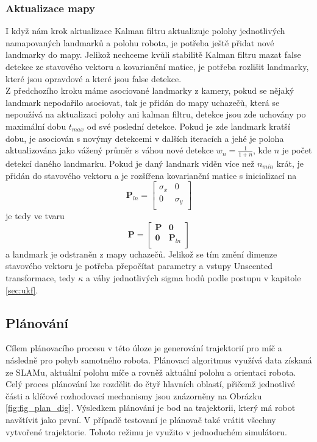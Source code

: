 \documentclass[a4paper,12pt]{article}
\begin{document}
\subsubsection{Aktualizace mapy}
I když nám krok aktualizace Kalman filtru aktualizuje polohy jednotlivých namapovaných landmarků a polohu robota, je potřeba ještě přidat nové landmarky do mapy.
Jelikož nechceme kvůli stabilitě Kalman filtru mazat false detekce ze stavového vektoru a kovarianční matice, 
je potřeba rozlišit landmarky, které jsou opravdové a které jsou false detekce.\\
Z předchozího kroku máme asociované landmarky z kamery, pokud se nějaký landmark nepodařilo asociovat, tak je přidán do mapy uchazečů, 
která se nepoužívá na aktualizaci polohy ani kalman filtru, detekce jsou zde uchovány po maximální dobu $t_{max}$ od své poslední detekce. 
Pokud je zde landmark kratší dobu, je asociován s novýmy detekcemi v dalších iteracích a jehé je poloha aktualizována jako vážený průměr s váhou nové detekce $w_n = \frac{1}{1 + n}$, kde $n$ je počet detekcí daného landmarku.
Pokud je daný landnark viděn více než $n_{min}$ krát, je přidán do stavového vektoru a je rozšířena kovarianční matice s inicializací na 
\[
\mathbf P_{ln} = \begin{bmatrix}
    \sigma_{x} & 0 \\
    0 & \sigma_{y} \\
\end{bmatrix}
\]
je tedy ve tvaru 
\[
\mathbf P =
\begin{bmatrix}
    \mathbf P & \mathbf 0 \\
    \mathbf 0 & \mathbf P_{ln} \\
\end{bmatrix}
\]
a landmark je odstraněn z mapy uchazečů.
Jelikož se tím změní dimenze stavového vektoru je potřeba přepočítat parametry a vstupy Unscented transformace, tedy $\kappa$ a váhy jednotlivých sigma bodů podle postupu v kapitole \ref{sec:ukf}.\\


\subsection{Plánování}
Cílem plánovacího procesu v této úloze je generování trajektorií pro míč a následně pro pohyb samotného robota. Plánovací algoritmus využívá data získaná ze SLAMu, aktuální polohu míče a rovněž aktuální polohu a orientaci robota. Celý proces plánování lze rozdělit do čtyř hlavních oblastí, přičemž jednotlivé části a klíčové rozhodovací mechanismy jsou znázorněny na Obrázku \ref{fig:fig_plan_dig}. Výsledkem plánování je bod na trajektorii, který má robot navštívit jako první. V případě testovaní je plánovač také vrátit všechny vytvořené trajektorie. Tohoto režimu je využito v jednoduchém simulátoru. 
\end{document}
